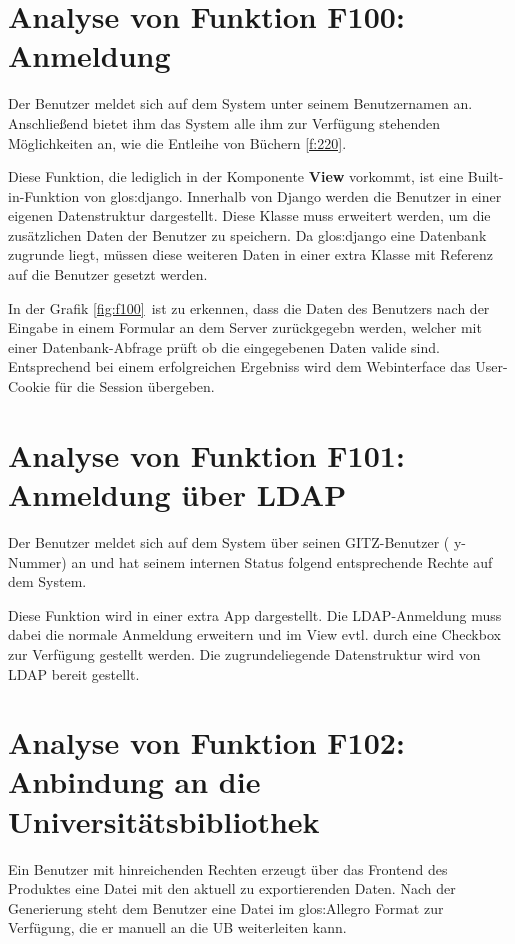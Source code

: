 \section{Analyse von Funktion F100: Anmeldung}
Der Benutzer meldet sich auf dem System unter seinem Benutzernamen an.
Anschließend bietet ihm das System alle ihm zur Verfügung stehenden
Möglichkeiten an, wie \zB die Entleihe von Büchern \ref{f:220}.


Diese Funktion, die lediglich in der Komponente \textbf{View} vorkommt, ist
eine Built-in-Funktion von \gls{glos:django}. Innerhalb von Django werden die Benutzer
in einer eigenen Datenstruktur  dargestellt. Diese Klasse muss erweitert werden,
um die zusätzlichen Daten der Benutzer zu speichern. Da \gls{glos:django} eine Datenbank
zugrunde liegt, müssen diese weiteren Daten in einer extra Klasse mit Referenz
auf die Benutzer gesetzt werden.


In der Grafik \ref{fig:f100}\ ist zu erkennen, dass die Daten des Benutzers nach
der Eingabe in einem Formular an dem Server zurückgegebn werden, welcher mit
einer Datenbank-Abfrage prüft ob die eingegebenen Daten valide sind.
Entsprechend bei einem erfolgreichen Ergebniss wird dem Webinterface das
User-Cookie für die Session übergeben.


\section{Analyse von Funktion F101: Anmeldung über LDAP}
Der Benutzer meldet sich auf dem System über seinen \Gls{GITZ}-Benutzer (\zB
y-Nummer) an und hat seinem internen Status folgend entsprechende Rechte auf dem
System.

Diese Funktion wird in einer extra App dargestellt. Die \gls{LDAP}-Anmeldung muss
dabei die normale Anmeldung erweitern und im View evtl. durch eine Checkbox zur
Verfügung gestellt werden. Die zugrundeliegende Datenstruktur wird von \gls{LDAP}
bereit gestellt.

\section{Analyse von Funktion F102: Anbindung an die Universitätsbibliothek}
Ein Benutzer mit hinreichenden Rechten erzeugt über das Frontend des Produktes
eine Datei mit den aktuell zu exportierenden Daten. Nach der Generierung steht
dem Benutzer eine Datei im \gls{glos:Allegro} Format zur Verfügung, die er
manuell an die \gls{UB} weiterleiten kann.


